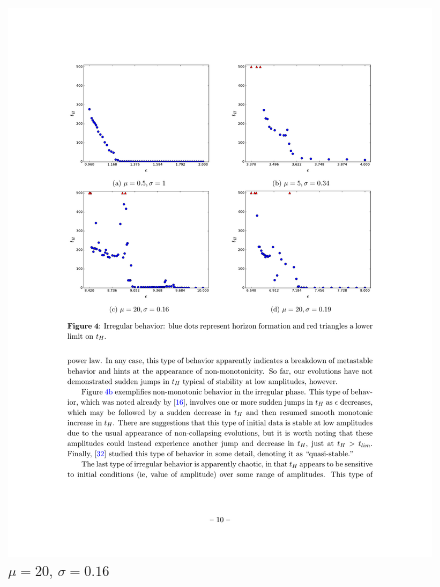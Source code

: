 \documentclass[mathserif,10pt]{beamer}
\begin{document}
{\begin{columns}
\begin{figure}
	\includegraphics[width=\textwidth]{m20w016} \\ $\mu = 20$, $\sigma = 0.16$
  	\end{figure}
  \end{columns}
}
\end{document}
